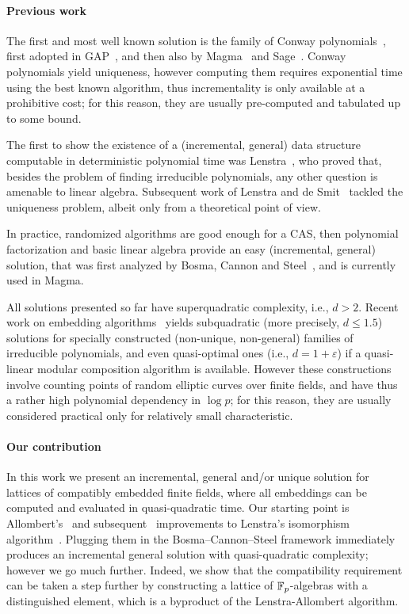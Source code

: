 \documentclass{sig-alternate}
\begin{document}
\paragraph{Previous work}
The first and most well known solution is the family of Conway
polynomials~\cite{Nickel1988,heath+loehr99}, first adopted in
GAP~\cite{GAP4}, and then also by Magma~\cite{MAGMA} and
Sage~\cite{Sage}. %
Conway polynomials yield uniqueness, however computing them requires
exponential time using the best known algorithm, thus incrementality is only available at a
prohibitive cost; for this reason, they are usually pre-computed and
tabulated up to some bound.

The first to show the existence of a (incremental, general) data
structure computable in deterministic polynomial time was
Lenstra~\cite{LenstraJr91}, who proved that, besides the problem of
finding irreducible polynomials, any other question is amenable to
linear algebra. %
Subsequent work of Lenstra and de
Smit~\cite{lenstra+desmit08-stdmodels} tackled the uniqueness problem,
albeit only from a theoretical point of view. %

In practice, randomized algorithms are good enough for a CAS, then
polynomial factorization and basic linear algebra provide an easy
(incremental, general) solution, that was first analyzed by Bosma,
Cannon and Steel~\cite{bosma+cannon+steel97}, and is currently used in
Magma. %

All solutions presented so far have superquadratic complexity, i.e.,
$d>2$. %
Recent work on embedding algorithms~\cite{DoSc12,DeDoSc13,DeDoSc2014}
yields subquadratic (more precisely, $d\le 1.5$) solutions for
specially constructed (non-unique, non-general) families of
irreducible polynomials, and even quasi-optimal ones (i.e.,
$d=1+\varepsilon$) if a quasi-linear modular composition algorithm is
available. %
However these constructions involve counting points of random elliptic
curves over finite fields, and have thus a rather high polynomial
dependency in $\log p$; for this reason, they are usually considered
practical only for relatively small characteristic.


\paragraph{Our contribution}
In this work we present an incremental, general and/or unique solution
for lattices of compatibly embedded finite fields, where all
embeddings can be computed and evaluated in quasi-quadratic time. %
Our starting point is Allombert's~\cite{Allombert02} and
subsequent~\cite{brieulle2018computing} improvements to Lenstra's
isomorphism algorithm~\cite{LenstraJr91}. %
Plugging them in the Bosma--Cannon--Steel framework immediately produces
an incremental general solution with quasi-quadratic complexity;
however we go much further. %
Indeed, we show that the compatibility requirement can be taken a step
further by constructing a lattice of $\mathbb{F}_{p}$-algebras with a
distinguished element, which is a byproduct of the Lenstra-Allombert
algorithm.
\end{document}
